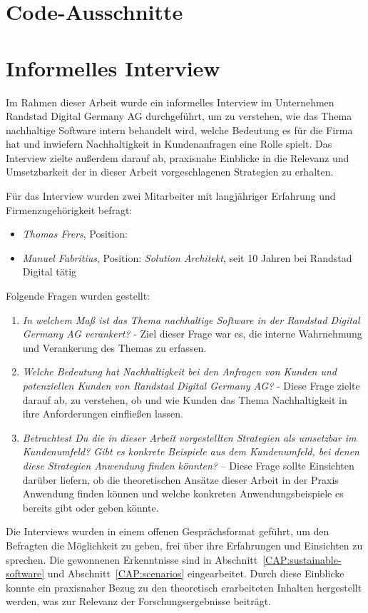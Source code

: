 \chapter{Code-Ausschnitte}




\chapter{Informelles Interview}\label{CAP:interview}
Im Rahmen dieser Arbeit wurde ein informelles Interview im Unternehmen Randstad Digital Germany AG durchgeführt, um zu verstehen, wie das Thema nachhaltige Software intern behandelt wird, welche Bedeutung es für die Firma hat und inwiefern Nachhaltigkeit in Kundenanfragen eine Rolle spielt.
Das Interview zielte außerdem darauf ab, praxisnahe Einblicke in die Relevanz und Umsetzbarkeit der in dieser Arbeit vorgeschlagenen Strategien zu erhalten.

Für das Interview wurden zwei Mitarbeiter mit langjähriger Erfahrung und Firmenzugehörigkeit befragt:
\begin{itemize}
    \item \textit{Thomas Frers}, Position: \textit{}
    \item \textit{Manuel Fabritius}, Position: \textit{Solution Architekt}, seit 10 Jahren bei Randstad Digital tätig
\end{itemize}
Folgende Fragen wurden gestellt:
\begin{enumerate}
    \item \textit{\glqq In welchem Maß ist das Thema nachhaltige Software in der Randstad Digital Germany AG verankert?\grqq{}} - Ziel dieser Frage war es, die interne Wahrnehmung und Verankerung des Themas zu erfassen.
    \item \textit{\glqq Welche Bedeutung hat Nachhaltigkeit bei den Anfragen von Kunden und potenziellen Kunden von Randstad Digital Germany AG?\grqq{}} - Diese Frage zielte darauf ab, zu verstehen, ob und wie Kunden das Thema Nachhaltigkeit in ihre Anforderungen einfließen lassen.
    \item \textit{\glqq Betrachtest Du die in dieser Arbeit vorgestellten Strategien als umsetzbar im Kundenumfeld? Gibt es konkrete Beispiele aus dem Kundenumfeld, bei denen diese Strategien Anwendung finden könnten?\grqq{}}  – Diese Frage sollte Einsichten darüber liefern, ob die theoretischen Ansätze dieser Arbeit in der Praxis Anwendung finden können und welche konkreten Anwendungsbeispiele es bereits gibt oder geben könnte.
\end{enumerate}
Die Interviews wurden in einem offenen Gesprächsformat geführt, um den Befragten die Möglichkeit zu geben, frei über ihre Erfahrungen und Einsichten zu sprechen.
Die gewonnenen Erkenntnisse sind in Abschnitt~\ref{CAP:sustainable-software} und Abschnitt~\ref{CAP:scenarios} eingearbeitet.
Durch diese Einblicke konnte ein praxisnaher Bezug zu den theoretisch erarbeiteten Inhalten hergestellt werden, was zur Relevanz der Forschungsergebnisse beiträgt.
